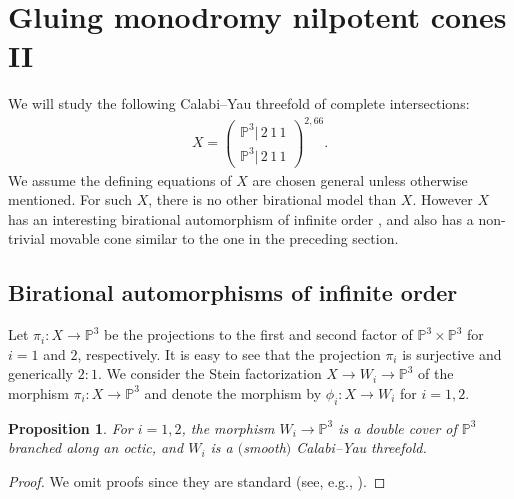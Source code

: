 \documentclass[10pt,a4paper]{amsart}
\numberwithin{equation}{section}
\newtheorem{Proposition}[Theorem]{Proposition}
\begin{document}
\section{Gluing monodromy nilpotent cones II}\label{section5}

We will study the following Calabi--Yau threefold of complete intersections:
\begin{gather*}
X=\left(\begin{smallmatrix}\mathbb{P}^{3}|\,2\,1\,1\\
\mathbb{P}^{3}|\,2\,1\,1
\end{smallmatrix}\right)^{2,66}.
\end{gather*}
We assume the defining equations of $X$ are chosen general unless otherwise mentioned. For such $X$, there is no other birational model than $X$. However $X$ has an interesting birational automorphism of infinite order \cite{Oguiso1}, and also has a non-trivial movable cone similar to the one in the preceding section.

\subsection{Birational automorphisms of infinite order}

Let $\pi_{i}\colon X\to\mathbb{P}^{3}$ be the projections to the first and second factor of $\mathbb{P}^{3}\times\mathbb{P}^{3}$ for $i=1$ and $2$, respectively. It is easy to see that the projection $\pi_{i}$ is surjective and generically $2:1$. We consider the Stein factorization $X\to W_{i}\to\mathbb{P}^{3}$ of the morphism $\pi_{i}\colon X\to\mathbb{P}^{3}$ and denote the morphism by $\phi_{i}\colon X\to W_{i}$ for $i=1,2$.
\begin{Proposition} For $i=1,2$, the morphism $W_{i}\to\mathbb{P}^{3}$ is a double cover of $\mathbb{P}^{3}$ branched along an octic, and $W_{i}$ is a $($smooth$)$ Calabi--Yau threefold. \end{Proposition}
\begin{proof} We omit proofs since they are standard (see, e.g., \cite{Oguiso1}).
\end{proof}
\end{document}
